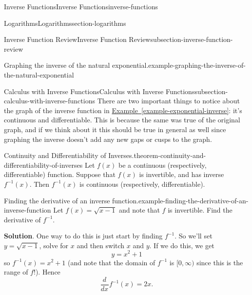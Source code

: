 \documentclass[oneside,10pt,]{book}
\numberwithin{equation}{section}
\newcommand{\dv}[3][]{\dfrac{d^{#1} #2}{d #3^{#1}}}
\begin{document}
\begin{chapterptx}{Inverse Functions}{}{Inverse Functions}{}{}{inverse-functions}
\begin{sectionptx}{Logarithms}{}{Logarithms}{}{}{section-logarithms}
\begin{subsectionptx}{Inverse Function Review}{}{Inverse Function Review}{}{}{subsection-inverse-function-review}
\begin{example}{Graphing the inverse of the natural exponential.}{example-graphing-the-inverse-of-the-natural-exponential}
\begin{figure}
{
}
\end{figure}
\end{example}
\end{subsectionptx}
%
%
\typeout{************************************************}
\typeout{************************************************}
%
\begin{subsectionptx}{Calculus with Inverse Functions}{}{Calculus with Inverse Functions}{}{}{subsection-calculus-with-inverse-functions}
\hypertarget{p-206}{}%
There are two important things to notice about the graph of the inverse function in \hyperref[example-exponential-inverse]{Example~\ref{example-exponential-inverse}}: it's continuous and differentiable. This is because the same was true of the original graph, and if we think about it this should be true in general as well since graphing the inverse doesn't add any new gaps or cusps to the graph.%
\begin{theorem}{Continuity and Differentiability of Inverses.}{}{theorem-continuity-and-differentiability-of-inverses}%
\hypertarget{p-207}{}%
Let \(f(x)\) be a continuous (respectively, differentiable) function. Suppose that \(f(x)\) is invertible, and has inverse \(f^{-1}(x)\). Then \(f^{-1}(x)\) is continuous (respectively, differentiable).%
\end{theorem}
\begin{example}{Finding the derivative of an inverse function.}{example-finding-the-derivative-of-an-inverse-function}%
\hypertarget{p-208}{}%
Let \(f(x) = \sqrt{x-1}\) and note that \(f\) is invertible. Find the derivative of \(f^{-1}\).%
\par\smallskip%
\noindent\textbf{Solution}.\hypertarget{solution-45}{}\quad%
\hypertarget{p-209}{}%
One way to do this is just start by finding \(f^{-1}\). So we'll set \(y = \sqrt{x-1}\), solve for \(x\) and then switch \(x\) and \(y\). If we do this, we get%
\begin{equation*}
y = x^{2} + 1
\end{equation*}
so \(f^{-1}(x) = x^{2} + 1\) (and note that the domain of \(f^{-1}\) is \([0,\infty)\) since this is the range of \(f\)!). Hence%
\begin{equation*}
\dv{}{x}f^{-1}(x) = 2x.
\end{equation*}
%
\end{example}

\end{subsectionptx}
\end{sectionptx}
\end{chapterptx}
\end{document}
